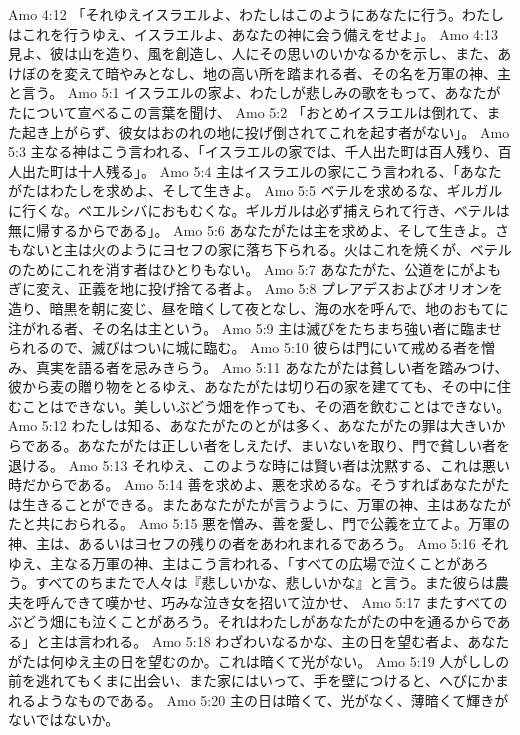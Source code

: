 Amo 4:12  「それゆえイスラエルよ、わたしはこのようにあなたに行う。わたしはこれを行うゆえ、イスラエルよ、あなたの神に会う備えをせよ」。
Amo 4:13  見よ、彼は山を造り、風を創造し、人にその思いのいかなるかを示し、また、あけぼのを変えて暗やみとなし、地の高い所を踏まれる者、その名を万軍の神、主と言う。
Amo 5:1  イスラエルの家よ、わたしが悲しみの歌をもって、あなたがたについて宣べるこの言葉を聞け、
Amo 5:2  「おとめイスラエルは倒れて、また起き上がらず、彼女はおのれの地に投げ倒されてこれを起す者がない」。
Amo 5:3  主なる神はこう言われる、「イスラエルの家では、千人出た町は百人残り、百人出た町は十人残る」。
Amo 5:4  主はイスラエルの家にこう言われる、「あなたがたはわたしを求めよ、そして生きよ。
Amo 5:5  ベテルを求めるな、ギルガルに行くな。ベエルシバにおもむくな。ギルガルは必ず捕えられて行き、ベテルは無に帰するからである」。
Amo 5:6  あなたがたは主を求めよ、そして生きよ。さもないと主は火のようにヨセフの家に落ち下られる。火はこれを焼くが、ベテルのためにこれを消す者はひとりもない。
Amo 5:7  あなたがた、公道をにがよもぎに変え、正義を地に投げ捨てる者よ。
Amo 5:8  プレアデスおよびオリオンを造り、暗黒を朝に変じ、昼を暗くして夜となし、海の水を呼んで、地のおもてに注がれる者、その名は主という。
Amo 5:9  主は滅びをたちまち強い者に臨ませられるので、滅びはついに城に臨む。
Amo 5:10  彼らは門にいて戒める者を憎み、真実を語る者を忌みきらう。
Amo 5:11  あなたがたは貧しい者を踏みつけ、彼から麦の贈り物をとるゆえ、あなたがたは切り石の家を建てても、その中に住むことはできない。美しいぶどう畑を作っても、その酒を飲むことはできない。
Amo 5:12  わたしは知る、あなたがたのとがは多く、あなたがたの罪は大きいからである。あなたがたは正しい者をしえたげ、まいないを取り、門で貧しい者を退ける。
Amo 5:13  それゆえ、このような時には賢い者は沈黙する、これは悪い時だからである。
Amo 5:14  善を求めよ、悪を求めるな。そうすればあなたがたは生きることができる。またあなたがたが言うように、万軍の神、主はあなたがたと共におられる。
Amo 5:15  悪を憎み、善を愛し、門で公義を立てよ。万軍の神、主は、あるいはヨセフの残りの者をあわれまれるであろう。
Amo 5:16  それゆえ、主なる万軍の神、主はこう言われる、「すべての広場で泣くことがあろう。すべてのちまたで人々は『悲しいかな、悲しいかな』と言う。また彼らは農夫を呼んできて嘆かせ、巧みな泣き女を招いて泣かせ、
Amo 5:17  またすべてのぶどう畑にも泣くことがあろう。それはわたしがあなたがたの中を通るからである」と主は言われる。
Amo 5:18  わざわいなるかな、主の日を望む者よ、あなたがたは何ゆえ主の日を望むのか。これは暗くて光がない。
Amo 5:19  人がししの前を逃れてもくまに出会い、また家にはいって、手を壁につけると、へびにかまれるようなものである。
Amo 5:20  主の日は暗くて、光がなく、薄暗くて輝きがないではないか。
